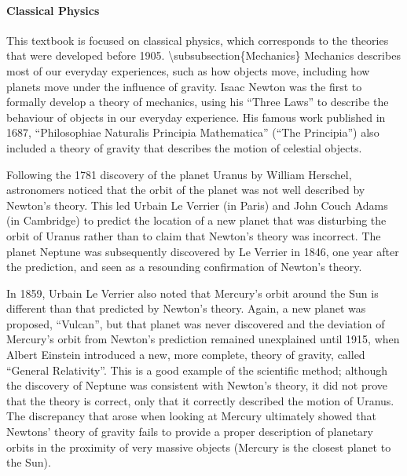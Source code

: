 \paragraph{Classical Physics}

This textbook is focused on classical physics, which corresponds to the theories that were developed before 1905.
{\textbackslash}subsubsection\{Mechanics\}
Mechanics describes most of our everyday experiences, such as how objects move, including how planets move under the influence of gravity. Isaac Newton was the first to formally develop a theory of mechanics, using his ``Three Laws'' to describe the behaviour of objects in our everyday experience. His famous work published in 1687, ``Philosophiae Naturalis Principia Mathematica'' (``The Principia'') also included a theory of gravity that describes the motion of celestial objects.

Following the 1781 discovery of the planet Uranus by William Herschel, astronomers noticed that the orbit of the planet was not well described by Newton's theory. This led Urbain Le Verrier (in Paris) and John Couch Adams (in Cambridge) to predict the location of a new planet that was disturbing the orbit of Uranus rather than to claim that Newton's theory was incorrect. The planet Neptune was subsequently discovered by Le Verrier in 1846, one year after the prediction, and seen as a resounding confirmation of Newton's theory.

In 1859, Urbain Le Verrier also noted that Mercury's orbit around the Sun is different than that predicted by Newton's theory. Again, a new planet was proposed, ``Vulcan'', but that planet was never discovered and the deviation of Mercury's orbit from Newton's prediction remained unexplained until 1915, when Albert Einstein introduced a new, more complete, theory of gravity, called ``General Relativity''. This is a good example of the scientific method; although the discovery of Neptune was consistent with Newton's theory, it did not prove that the theory is correct, only that it correctly described the motion of Uranus. The discrepancy that arose when looking at Mercury ultimately showed that Newtons' theory of gravity fails to provide a proper description of planetary orbits in the proximity of very massive objects (Mercury is the closest planet to the Sun).

